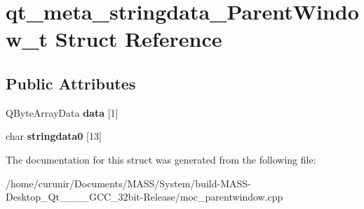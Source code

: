 \hypertarget{structqt__meta__stringdata___parent_window__t}{}\section{qt\+\_\+meta\+\_\+stringdata\+\_\+\+Parent\+Window\+\_\+t Struct Reference}
\label{structqt__meta__stringdata___parent_window__t}
\subsection*{Public Attributes}
\begin{DoxyCompactItemize}
\item 
Q\+Byte\+Array\+Data {\bfseries data} \mbox{[}1\mbox{]}\hypertarget{structqt__meta__stringdata___parent_window__t_afab90f05f6130401ec3a3f4848f435f8}{}\label{structqt__meta__stringdata___parent_window__t_afab90f05f6130401ec3a3f4848f435f8}

\item 
char {\bfseries stringdata0} \mbox{[}13\mbox{]}\hypertarget{structqt__meta__stringdata___parent_window__t_a0db0c40a6d8dd01716efd3b1ace240f2}{}\label{structqt__meta__stringdata___parent_window__t_a0db0c40a6d8dd01716efd3b1ace240f2}

\end{DoxyCompactItemize}


The documentation for this struct was generated from the following file\+:\begin{DoxyCompactItemize}
\item 
/home/curunir/\+Documents/\+M\+A\+S\+S/\+System/build-\/\+M\+A\+S\+S-\/\+Desktop\+\_\+\+Qt\+\_\+\_\+\_\+\_\+\+G\+C\+C\+\_\+32bit-\/\+Release/moc\+\_\+parentwindow.\+cpp\end{DoxyCompactItemize}
